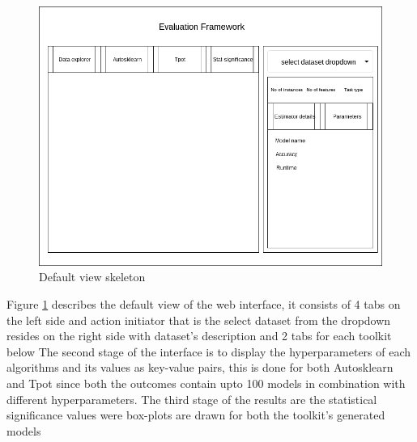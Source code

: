 \begin{figure}[!h]
    	\centering
    	\includegraphics[width=0.8\linewidth]{thesis_template/images/Default_skeleton.png}
    	\caption{Default view skeleton}
    	\label{fig:default_skeleton}
        \end{figure}

Figure \ref{fig:default_skeleton} describes the default view of the web interface, it consists of 4 tabs on the left side and action initiator that is the select dataset from the dropdown resides on the right side with dataset's description and 2 tabs for each toolkit below
The second stage of the interface is to display the hyperparameters of each algorithms and its values as key-value pairs, this is done for both Autosklearn and Tpot since both the outcomes contain upto 100 models in combination with different hyperparameters. The third stage of the results are the statistical significance values were box-plots are drawn for both the toolkit's generated models



